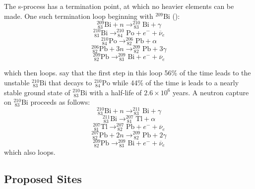 The s-process has a termination point, at which no heavier elements
can be made.  One such termination loop beginning with $^{209}$Bi
(\citealt{claytonetal1961}):
\begin{equation*}
^{209}_{\ 83}\textrm{Bi} + n  \rightarrow ^{210}_{\ 83}\textrm{Bi} +
\gamma 
\end{equation*}
\begin{equation*}
^{210}_{\ 83}\textrm{Bi}   \rightarrow ^{210}_{\ 84}\textrm{Po} +
e^- + \overline{\nu}_e 
\end{equation*}
\begin{equation*}
^{210}_{\ 84}\textrm{Po}   \rightarrow ^{206}_{\ 82}\textrm{Pb} +
\alpha 
\end{equation*}
\begin{equation*}
^{206}_{\ 82}\textrm{Pb} + 3n  \rightarrow ^{209}_{\ 82}\textrm{Pb} +
3\gamma 
\end{equation*}
\begin{equation}
^{209}_{\ 82}\textrm{Pb}  \rightarrow ^{209}_{\ 83}\textrm{Bi} + e^-
+ \overline{\nu}_e
\end{equation}

which then loops.  \cite{claytonetal1961} say that the first step in this loop 56\% of
the time leads to the unstable $^{210}_{\ 83}\textrm{Bi}$ that decays
to $^{210}_{\ 84}\textrm{Po}$ while 44\% of the time is leads to a
nearly stable ground state of $^{210}_{\ 83}\textrm{Bi}$ with a
half-life of $2.6 \times 10^6$ years.  A neutron capture
on $^{210}_{\ 83}\textrm{Bi}$ proceeds as follows:
\begin{equation*}
^{210}_{\ 83}\textrm{Bi} + n  \rightarrow ^{211}_{\ 83}\textrm{Bi} +
\gamma
\end{equation*}
\begin{equation*}
^{211}_{\ 83}\textrm{Bi}  \rightarrow ^{207}_{\ 81}\textrm{Tl} + \alpha
\end{equation*}
\begin{equation*}
 ^{207}_{\ 81}\textrm{Tl}  \rightarrow  ^{207}_{\ 82}\textrm{Pb} + e^-
 + \overline{\nu}_e
\end{equation*}
\begin{equation*}
^{207}_{\ 82}\textrm{Pb} + 2n  \rightarrow ^{209}_{\ 82}\textrm{Pb} +
2\gamma
\end{equation*}
\begin{equation}
^{209}_{\ 82}\textrm{Pb}  \rightarrow ^{209}_{\ 83}\textrm{Bi} + e^- + \overline{\nu}_e
\end{equation}
which also loops.


\subsection{Proposed Sites}
